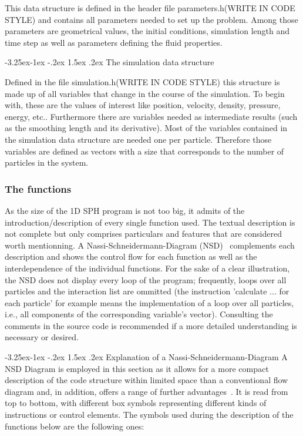 \documentclass{report}
\makeatletter
\renewcommand\paragraph{\@startsection{paragraph}{4}{\z@}%
  {-3.25ex\@plus -1ex \@minus -.2ex}%
  {1.5ex \@plus .2ex}%
  {\normalfont\normalsize\bfseries}}
\makeatother
\begin{document}
This data structure is defined in the header file parameters.h(WRITE IN CODE STYLE) and 
contains all parameters needed to set up the problem. Among those parameters are 
geometrical values, the initial conditions, simulation length and time step 
as well as parameters defining the fluid properties.

\paragraph{The simulation data structure}

Defined in the file simulation.h(WRITE IN CODE STYLE) this structure is made up of all 
variables that change in the course of the simulation. To begin with, these are the 
values of interest like position, velocity, density, pressure, energy, etc.. 
Furthermore there are variables needed as intermediate results (such as the smoothing 
length and its derivative). 
Most of the variables contained in the simulation data structure are needed one per 
particle. Therefore those variables are defined as vectors with a size that corresponds 
to the number of particles in the system. 

\subsubsection{The functions}

As the size of the 1D SPH program is not too big, it admits of the 
introduction/description of every single function used. The textual description is not complete but only comprises particulars and features that are considered worth mentionning. A Nassi-Schneidermann-Diagram (NSD)~\cite{Nassi1973} complements each description and shows the control flow for each function as well as the interdependence of the individual functions. For the sake of a clear illustration, the NSD does not display every loop of the program; frequently, loops over all particles and the interaction list are ommitted (the instruction 'calculate ... for each particle' for example means the implementation of a loop over all particles, i.e., all components of the corresponding variable's vector).  Consulting the comments in the source code is recommended if a more detailed understanding is necessary or desired.

\paragraph{Explanation of a Nassi-Schneidermann-Diagram}
A NSD Diagram is employed in this section as it allows for a more compact description of the code structure within limited space than a conventional flow diagram and, in addition, offers a range of further advantages~\cite{Nassi1973}. It is read from top to bottom, with different box symbols representing different kinds of instructions or control elements. The symbols used during the description of the functions below are the following ones:
\end{document}

